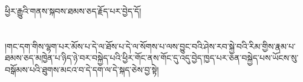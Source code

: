 ཕྱིར་རྒྱུའི་གནས་སྐབས་ཐམས་ཅད་རྗོད་པར་བྱེད་དོ།\chapter{ }།གང་དག་གིས་ལྷག་པར་མོས་པ་དེ་ལ་ཐོས་པ་དེ་ལ་སོགས་པ་ལས་བྱུང་བའི་ཤེས་རབ་སྐྱེ་བའི་རིམ་གྱིས་རྣམ་པ་ཐམས་ཅད་མཁྱེན་པ་ཉིད་ཉེ་བར་བསྐྱེད་པའི་ཕྱིར་གོང་ནས་གོང་དུ་འདུ་བྱེད་ཁྱད་པར་ཅན་བསྐྱེད་པས་ཡོངས་སུ་བསྒོམས་པའི་ཐུགས་མངའ་བ་དེ་དག་ལ་དེ་སྐད་ཅེས་བྱ་སྟེ།\chapter{ }